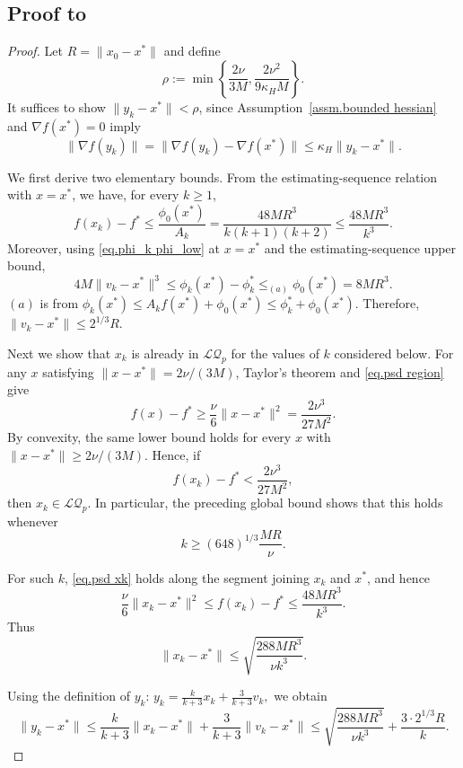 \documentclass{article}
\numberwithin{equation}{section}
\numberwithin{equation}{section}
\begin{document}
\subsection*{Proof to }
\begin{proof}
    Let $R=\|x_0-x^*\|$ and define
    \[
        \rho:=\min\left\{\frac{2\nu}{3M},\frac{2\nu^2}{9\kappa_HM}\right\}.
    \]
    It suffices to show $\|y_k-x^*\|<\rho$, since Assumption~\ref{assm.bounded hessian} and
    $\nabla f(x^*)=0$ imply
    \[
        \|\nabla f(y_k)\|
        =\|\nabla f(y_k)-\nabla f(x^*)\|
        \leq \kappa_H\|y_k-x^*\|.
    \]

    We first derive two elementary bounds. From the estimating-sequence relation with
    $x=x^*$, we have, for every $k\geq1$,
    \[
        f(x_k)-f^*
        \leq \frac{\phi_0(x^*)}{A_k}
        = \frac{48MR^3}{k(k+1)(k+2)}
        \leq \frac{48MR^3}{k^3}.
    \]
    Moreover, using \eqref{eq.phi_k phi_low} at $x=x^*$ and the estimating-sequence
    upper bound,
    \[
        4M\|v_k-x^*\|^3
        \leq \phi_k(x^*)-\phi_k^*
        \leq_{(a)} \phi_0(x^*)
        =8MR^3.
    \]
    $(a)$ is from $\phi_k(x^*)\le A_k f(x^*)+\phi_0(x^*) \le \phi_k^*+\phi_0(x^*)$. Therefore,
    \(
    \|v_k-x^*\|\leq 2^{1/3}R.
    \)

    Next we show that $x_k$ is already in $\mathcal{LQ}_p$ for the values of $k$
    considered below. For any $x$ satisfying
    $\|x-x^*\|=2\nu/(3M)$, Taylor's theorem and \eqref{eq.psd region} give
    \[
        f(x)-f^*
        \geq \frac{\nu}{6}\|x-x^*\|^2
        = \frac{2\nu^3}{27M^2}.
    \]
    By convexity, the same lower bound holds for every
    $x$ with $\|x-x^*\|\geq 2\nu/(3M)$. Hence, if
    \[
        f(x_k)-f^*<\frac{2\nu^3}{27M^2},
    \]
    then $x_k\in\mathcal{LQ}_p$. In particular, the preceding global bound shows that
    this holds whenever
    \[
        k\geq \left(648\right)^{1/3}\frac{MR}{\nu}.
    \]

    For such $k$, \eqref{eq.psd xk} holds along the segment joining $x_k$ and $x^*$,
    and hence
    \[
        \frac{\nu}{6}\|x_k-x^*\|^2
        \leq f(x_k)-f^*
        \leq \frac{48MR^3}{k^3}.
    \]
    Thus
    \[
        \|x_k-x^*\|
        \leq \sqrt{\frac{288MR^3}{\nu k^3}}.
    \]

    Using the definition of $y_k$:
    \(
    y_k=\frac{k}{k+3}x_k+\frac{3}{k+3}v_k,
    \)
    we obtain
    \[
        \|y_k-x^*\|
        \leq \frac{k}{k+3}\|x_k-x^*\|
        +\frac{3}{k+3}\|v_k-x^*\|
        \leq \sqrt{\frac{288MR^3}{\nu k^3}}
        +\frac{3\cdot 2^{1/3}R}{k}.
    \]


\end{proof}
\end{document}

